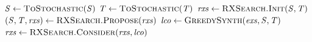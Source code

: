 \documentclass[acmsmall,screen,anonymous]{acmart}
\begin{document}
\begin{algorithm}
  \caption{\SynthSymLens}
  \label{alg:synth-sym-lens}
  \begin{algorithmic}[1]
    \State $\Regex \gets \Call{\ToStochastic}{\Regex}$
    \State $\RegexAlt \gets \Call{\ToStochastic}{\RegexAlt}$
    \State $\RXSearchState \gets \Call{\RXSearch.Init}{\Regex,\RegexAlt}$
    \State $(\Regex,\RegexAlt,\RXSearchState) \gets \Call{\RXSearch.Propose}{\RXSearchState}$
    \State $\LCO \gets \Call{\GreedySynth}{\Examples,\Regex,\RegexAlt}$
    \State $\RXSearchState \gets \Call{\RXSearch.Consider}{\RXSearchState,\LCO}$
    \EndWhile
    \EndFunction
  \end{algorithmic}
\end{algorithm}
\end{document}
